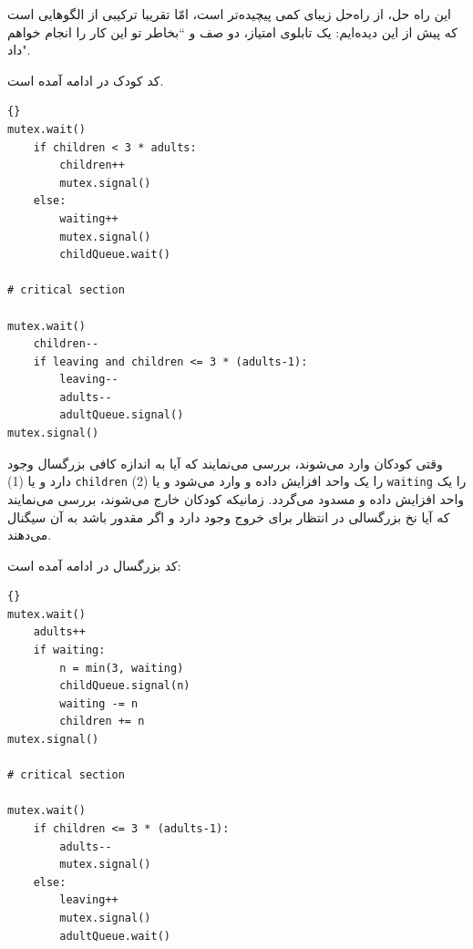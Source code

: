 \documentclass{book}
\begin{document}
    این راه حل، از را‌ه‌حل زیبای  کمی پیچیده‌تر است، امّا تقریبا ترکیبی از الگوهایی است که پیش از این  دیده‌ایم: یک تابلوی امتیاز، دو صف و 
    ‍‍‍‍‍``بخاطر تو این کار را انجام خواهم داد".

    کد کودک در ادامه آمده است. 

\begin{latin}
\begin{lstlisting}[title=\rl{راه‌حل توسعه‌یافته مرکز مراقبت از کودکان (کودک)}]{}
mutex.wait()
    if children < 3 * adults:
        children++
        mutex.signal()
    else:
        waiting++
        mutex.signal()
        childQueue.wait()

# critical section

mutex.wait()
    children--
    if leaving and children <= 3 * (adults-1):
        leaving--
        adults--
        adultQueue.signal() 
mutex.signal()
\end{lstlisting}
\end{latin}

    وقتی کودکان وارد می‌شوند، بررسی می‌نمایند که آیا به اندازه کافی بزرگسال وجود دارد و یا  (1) {\tt children} را یک واحد افزایش داده و وارد می‌شود و 
    یا (2) {\tt waiting}  را یک واحد افزایش داده و مسدود می‌گردد. زمانیکه کودکان خارج می‌شوند، بررسی می‌نمایند که آیا نخ بزرگسالی در انتظار برای خروج 
    وجود دارد و اگر مقدور باشد به آن سیگنال می‌دهند. 
    
\newpage
    کد بزرگسال در ادامه آمده است:

\begin{latin}
\begin{lstlisting}[title=\rl{راه‌حل توسعه‌یافته مرکز مراقبت از کودکان (بزرگسال)}]{}
mutex.wait()
    adults++
    if waiting:
        n = min(3, waiting)
        childQueue.signal(n)
        waiting -= n
        children += n
mutex.signal()

# critical section

mutex.wait()
    if children <= 3 * (adults-1):
        adults--
        mutex.signal()
    else:
        leaving++
        mutex.signal()
        adultQueue.wait() 
\end{lstlisting}
\end{latin}
\end{document}

